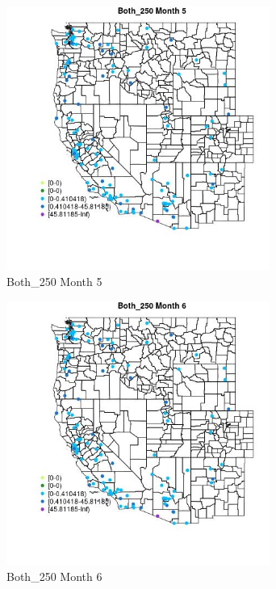 \begin{figure} 
\centering  
\includegraphics[width=0.77\textwidth]{Code_Outputs/Report_ML_input_PM25_Step4_part_e_de_duplicated_aves_MapObsMo5Both_250.jpg} 
\caption{\label{fig:Report_ML_input_PM25_Step4_part_e_de_duplicated_avesMapObsMo5Both_250}Both_250 Month 5} 
\end{figure} 
 

\begin{figure} 
\centering  
\includegraphics[width=0.77\textwidth]{Code_Outputs/Report_ML_input_PM25_Step4_part_e_de_duplicated_aves_MapObsMo6Both_250.jpg} 
\caption{\label{fig:Report_ML_input_PM25_Step4_part_e_de_duplicated_avesMapObsMo6Both_250}Both_250 Month 6} 
\end{figure} 
 

